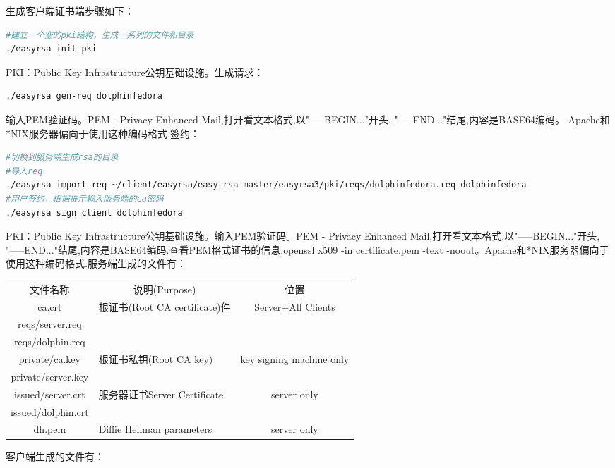 \documentclass[12pt]{book}
\numberwithin{dummy}{section}
\theoremstyle{ocrenumbox}
\theoremstyle{blacknumex}
\theoremstyle{blacknumbox}
\theoremstyle{ocrenum}
\begin{document}
生成客户端证书端步骤如下：

\begin{lstlisting}[language=Bash]
#建立一个空的pki结构，生成一系列的文件和目录
./easyrsa init-pki
\end{lstlisting}

PKI：Public Key Infrastructure公钥基础设施。生成请求：

\begin{lstlisting}[language=Bash]
./easyrsa gen-req dolphinfedora
\end{lstlisting}

输入PEM验证码。PEM - Privacy Enhanced Mail,打开看文本格式,以"-----BEGIN..."开头, "-----END..."结尾,内容是BASE64编码。
Apache和*NIX服务器偏向于使用这种编码格式.签约：

\begin{lstlisting}[language=Bash]
#切换到服务端生成rsa的目录
#导入req
./easyrsa import-req ~/client/easyrsa/easy-rsa-master/easyrsa3/pki/reqs/dolphinfedora.req dolphinfedora
#用户签约，根据提示输入服务端的ca密码
./easyrsa sign client dolphinfedora
\end{lstlisting}

PKI：Public Key Infrastructure公钥基础设施。输入PEM验证码。PEM - Privacy Enhanced Mail,打开看文本格式,以"-----BEGIN..."开头, "-----END..."结尾,内容是BASE64编码.查看PEM格式证书的信息:openssl x509 -in certificate.pem -text -noout。Apache和*NIX服务器偏向于使用这种编码格式.服务端生成的文件有：

\begin{tabular}{|c|p{5cm}|c|}
	\hline
	\multirow{1}{*}{文件名称}
	& \multicolumn{1}{c|}{说明(Purpose)} 
	& \multicolumn{1}{c|}{位置} \\			
	\cline{1-3}
	ca.crt  & 根证书(Root CA certificate)件 & Server+All Clients	\\
	\hline
	reqs/server.req  & &\\
	\hline
	reqs/dolphin.req  & &\\
	\hline
	private/ca.key & 根证书私钥(Root CA key) & key signing machine only\\
	\hline
	private/server.key && \\
	\hline
	issued/server.crt & 服务器证书Server Certificate & server only\\
	\hline
	issued/dolphin.crt && \\
	\hline
	dh.pem & Diffie Hellman parameters & server only \\
	\hline
\end{tabular}

客户端生成的文件有：
\end{document}
